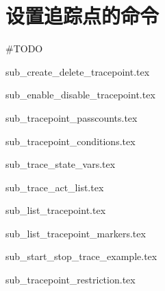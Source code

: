 \section{设置追踪点的命令}

\#TODO

{sub_create_delete_tracepoint.tex}

{sub_enable_disable_tracepoint.tex}

{sub_tracepoint_passcounts.tex}

{sub_tracepoint_conditions.tex}

{sub_trace_state_vars.tex}

{sub_trace_act_list.tex}

{sub_list_tracepoint.tex}

{sub_list_tracepoint_markers.tex}

{sub_start_stop_trace_example.tex}

{sub_tracepoint_restriction.tex}
